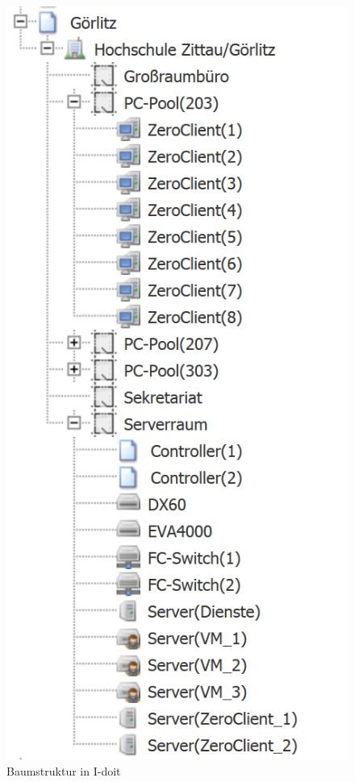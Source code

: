 \begin{figure}[htbp]
\includegraphics[scale=1]{images/idoittree}
\caption{Baumstruktur in I-doit}
\label{fig:idoittree}
\end{figure}

